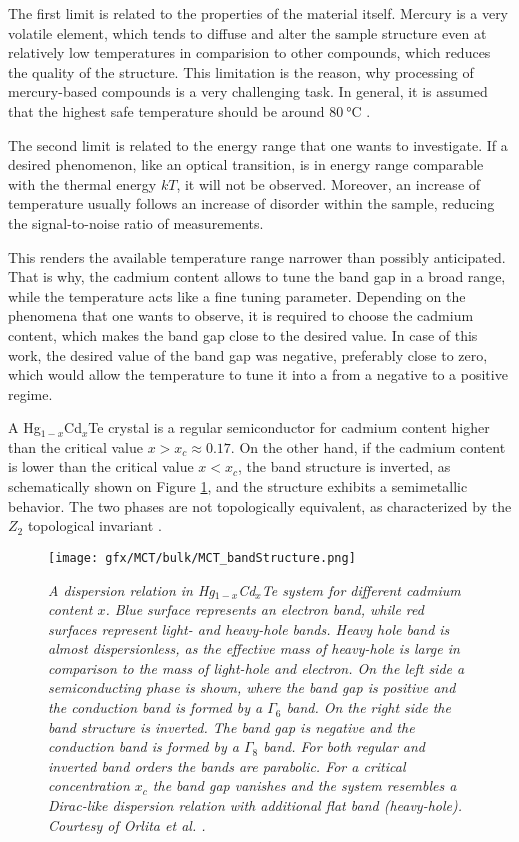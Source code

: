\documentclass[titlepage,a4paper]{book}
\begin{document}
The first limit is related to the properties of the material itself. Mercury is a very volatile element, which tends to diffuse and alter the sample structure even at relatively low temperatures in comparision to other compounds, which reduces the quality of the structure. This limitation is the reason, why processing of mercury-based compounds is a very challenging task. In general, it is assumed that the highest safe temperature should be around $\SI{80}{\degreeCelsius}$ \cite{Daumer_MCT_temperature}.

The second limit is related to the energy range that one wants to investigate. If a desired phenomenon, like an optical transition, is in energy range comparable with the thermal energy $kT$, it will not be observed. Moreover, an increase of temperature usually follows an increase of disorder within the sample, reducing the signal-to-noise ratio of measurements.

This renders the available temperature range narrower than possibly anticipated. That is why, the cadmium content allows to tune the band gap in a broad range, while the temperature acts like a fine tuning parameter. Depending on the phenomena that one wants to observe, it is required to choose the cadmium content, which makes the band gap close to the desired value. In case of this work, the desired value of the band gap was negative, preferably close to zero, which would allow the temperature to tune it into a from a negative to a positive regime. 

A Hg$_{1-x}$Cd$_x$Te crystal is a regular semiconductor for cadmium content higher than the critical value $x > x_c \approx 0.17$. On the other hand, if the cadmium content is lower than the critical value $x < x_c$, the band structure is inverted, as schematically shown on Figure \ref{fig:MCT_bandStructure}, and the structure exhibits a semimetallic behavior. The two phases are not topologically equivalent, as characterized by the $Z_2$ topological invariant \cite{Bernevig_Topology2}.

\begin{figure}[ht]
	\centering
	\texttt{[image: gfx/MCT/bulk/MCT\_bandStructure.png]}
	\vspace{-10pt}
	\caption{\textit{A dispersion relation in Hg$_{1-x}$Cd$_x$Te system for different cadmium content $x$. Blue surface represents an electron band, while red surfaces represent light- and heavy-hole bands. Heavy hole band is almost dispersionless, as the effective mass of heavy-hole is large in comparison to the mass of light-hole and electron. On the left side a semiconducting phase is shown, where the band gap is positive and the conduction band is formed by a $\Gamma_6$ band. On the right side the band structure is inverted. The band gap is negative and the conduction band is formed by a $\Gamma_8$ band. For both regular and inverted band orders the bands are parabolic. For a critical concentration $x_c$ the band gap vanishes and the system resembles a Dirac-like dispersion relation with additional flat band (heavy-hole). Courtesy of Orlita \textit{et al.} \cite{Orlita_MCT}.}}
	\label{fig:MCT_bandStructure}
\end{figure} 
\end{document}
